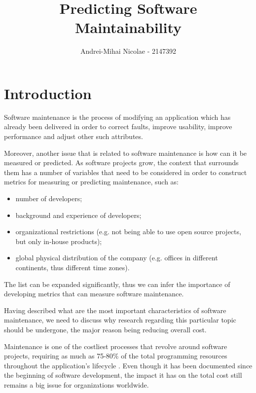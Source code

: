 \documentclass[a4paper,portrait,12pt]{article}
\author{Andrei-Mihai Nicolae - 2147392}
\title{Predicting Software Maintainability}
\begin{document}
\setlength{\oddsidemargin}{0.9847in-1in}
\setlength{\textwidth}{\paperwidth - 0.9847in-0.9847in}
  
\maketitle

 \section{Introduction}
  
  Software maintenance is the process of modifying an application which has
  already been delivered in order to correct faults, improve usability,
  improve performance and adjust other such attributes\citep{iee1990ieee}. 
 
    Moreover, another issue that is related to software maintenance is how 
  can it be measured or predicted. As software projects grow, the context that 
  surrounds them has a number of variables that need to be considered in order 
  to construct metrics for measuring or predicting maintenance, such as:
    \begin{itemize}
      \item number of developers;
      \item background and experience of developers;
      \item organizational restrictions (e.g. not being able to use open 
      source projects, but only in-house products);
      \item global physical distribution of the company (e.g. offices in
      different continents, thus different time zones).
    \end{itemize}
  The list can be expanded significantly, thus we can infer the importance 
  of developing metrics that can measure software maintenance.

  Having described what are the most important characteristics of software
  maintenance, we need to discuss why research regarding this particular
  topic should be undergone, the major reason being reducing overall cost.
  
  Maintenance is one of the costliest processes that revolve around software 
  projects, requiring as much as 75-80\% of the total programming resources 
  throughout the application's lifecycle \citep{lientz1978characteristics}. 
  Even though it has been documented since the beginning of software 
  development, the impact it has on the total cost still remains a big issue 
  for organizations worldwide. 
\end{document}
